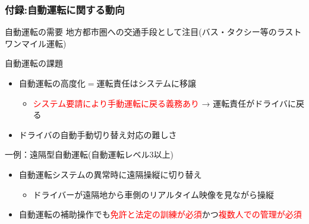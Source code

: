 \documentclass[unicode, 9pt, aspectratio=169]{beamer}
\begin{document}
\begin{frame}
  \frametitle{付録:自動運転に関する動向}
  \centering
  \begin{minipage}{.8\linewidth}
    \begin{block}{自動運転の需要}
    地方都市圏への交通手段として注目(バス・タクシー等のラストワンマイル運転)
    \end{block}
    
    \begin{alertblock}{自動運転の課題}
      \begin{itemize}
        \item 自動運転の高度化$=$運転責任はシステムに移譲
        \begin{itemize}
          \item \textcolor{red}{システム要請により手動運転に戻る義務あり} → 運転責任がドライバに戻る
        \end{itemize}
        \item ドライバの自動手動切り替え対応の難しさ
      \end{itemize}
    \end{alertblock}
    \begin{exampleblock}{一例：遠隔型自動運転(自動運転レベル3以上)}
      \begin{itemize}
        \item 自動運転システムの異常時に遠隔操縦に切り替え
        \begin{itemize}
          \item ドライバーが遠隔地から車側のリアルタイム映像を見ながら操縦
        \end{itemize}        
        \item 自動運転の補助操作でも\textcolor{red}{免許と法定の訓練が必須}かつ\textcolor{red}{複数人での管理が必須}
      \end{itemize}
    \end{exampleblock}
  \end{minipage}
\end{frame}
\end{document}
